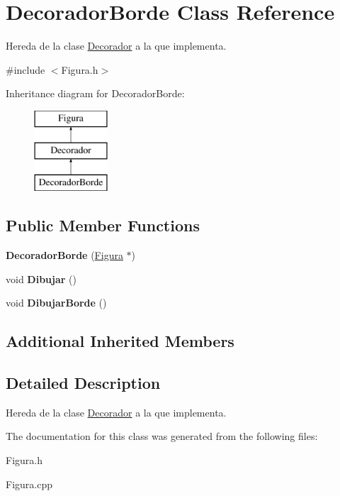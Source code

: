 \hypertarget{class_decorador_borde}{\section{Decorador\-Borde Class Reference}
\label{class_decorador_borde}
}


Hereda de la clase \hyperlink{class_decorador}{Decorador} a la que implementa.  




{\ttfamily \#include $<$Figura.\-h$>$}

Inheritance diagram for Decorador\-Borde\-:\begin{figure}[H]
\begin{center}
\leavevmode
\includegraphics[height=3.000000cm]{class_decorador_borde}
\end{center}
\end{figure}
\subsection*{Public Member Functions}
\begin{DoxyCompactItemize}
\item 
\hypertarget{class_decorador_borde_abeb9d06aab3c29316d56c5189969e1f0}{{\bfseries Decorador\-Borde} (\hyperlink{class_figura}{Figura} $\ast$)}\label{class_decorador_borde_abeb9d06aab3c29316d56c5189969e1f0}

\item 
\hypertarget{class_decorador_borde_ac79c91757f9b61a5a04bc891539e2054}{void {\bfseries Dibujar} ()}\label{class_decorador_borde_ac79c91757f9b61a5a04bc891539e2054}

\item 
\hypertarget{class_decorador_borde_a29f0ee36e44ed4addf456e477ffd23ee}{void {\bfseries Dibujar\-Borde} ()}\label{class_decorador_borde_a29f0ee36e44ed4addf456e477ffd23ee}

\end{DoxyCompactItemize}
\subsection*{Additional Inherited Members}


\subsection{Detailed Description}
Hereda de la clase \hyperlink{class_decorador}{Decorador} a la que implementa. 

The documentation for this class was generated from the following files\-:\begin{DoxyCompactItemize}
\item 
Figura.\-h\item 
Figura.\-cpp\end{DoxyCompactItemize}
